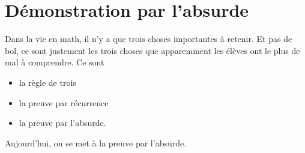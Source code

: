 \documentclass{article}
\begin{document}
































\renewcommand{\thecontBla}{}
\theoremstyle{exclamations}
\newtheorem{pour_idee}[contBla]{Idée !}
\newtheorem{pour_pourquoidonc}[contBla]{Comment ? Pourquoi ?}
\newtheorem{pour_probleme}[contBla]{Y'a une faute ?}
\newenvironment{idee}{\bgroup \green \begin{pour_idee}}{\end{pour_idee}\egroup}
\newenvironment{pourquoidonc}{\bgroup \blue \begin{pour_pourquoidonc}}{\end{pour_pourquoidonc}\egroup}
\newenvironment{probleme}{\bgroup \red \begin{pour_probleme}}{\end{pour_probleme}\egroup}


\section{Démonstration par l'absurde}

Dans la vie en math, il n'y a que trois choses importantes à retenir. Et pas de bol, ce sont justement les trois choses que apparemment les élèves ont le plus de mal à comprendre. Ce sont
\begin{itemize}
\item la règle de trois
\item la preuve par récurrence
\item la preuve par l'absurde.
\end{itemize}
Aujourd'hui, on se met à la preuve par l'absurde.
\end{document}
